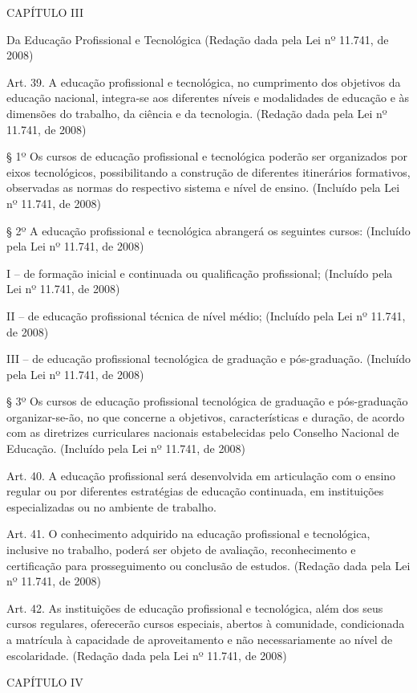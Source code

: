 \documentclass[
]{book}
\begin{document}
CAPÍTULO III

Da Educação Profissional e Tecnológica
(Redação dada pela Lei nº 11.741, de 2008)

Art. 39. A educação profissional e tecnológica, no cumprimento dos objetivos da educação nacional, integra-se aos diferentes níveis e modalidades de educação e às dimensões do trabalho, da ciência e da tecnologia. (Redação dada pela Lei nº 11.741, de 2008)

§ 1º Os cursos de educação profissional e tecnológica poderão ser organizados por eixos tecnológicos, possibilitando a construção de diferentes itinerários formativos, observadas as normas do respectivo sistema e nível de ensino. (Incluído pela Lei nº 11.741, de 2008)

§ 2º A educação profissional e tecnológica abrangerá os seguintes cursos: (Incluído pela Lei nº 11.741, de 2008)

I -- de formação inicial e continuada ou qualificação profissional; (Incluído pela Lei nº 11.741, de 2008)

II -- de educação profissional técnica de nível médio; (Incluído pela Lei nº 11.741, de 2008)

III -- de educação profissional tecnológica de graduação e pós-graduação. (Incluído pela Lei nº 11.741, de 2008)

§ 3º Os cursos de educação profissional tecnológica de graduação e pós-graduação organizar-se-ão, no que concerne a objetivos, características e duração, de acordo com as diretrizes curriculares nacionais estabelecidas pelo Conselho Nacional de Educação. (Incluído pela Lei nº 11.741, de 2008)

Art. 40. A educação profissional será desenvolvida em articulação com o ensino regular ou por diferentes estratégias de educação continuada, em instituições especializadas ou no ambiente de trabalho.

Art. 41. O conhecimento adquirido na educação profissional e tecnológica, inclusive no trabalho, poderá ser objeto de avaliação, reconhecimento e certificação para prosseguimento ou conclusão de estudos. (Redação dada pela Lei nº 11.741, de 2008)

Art. 42. As instituições de educação profissional e tecnológica, além dos seus cursos regulares, oferecerão cursos especiais, abertos à comunidade, condicionada a matrícula à capacidade de aproveitamento e não necessariamente ao nível de escolaridade. (Redação dada pela Lei nº 11.741, de 2008)

CAPÍTULO IV
\end{document}
